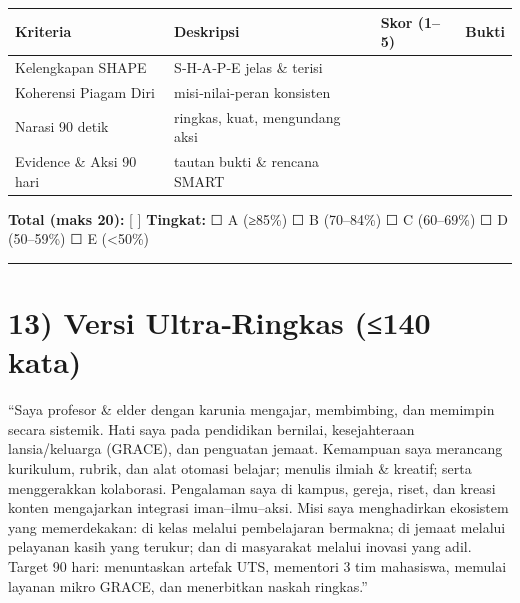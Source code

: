 \documentclass[
  letterpaper,
  DIV=11,
  numbers=noendperiod]{scrreprt}
\begin{document}
\begin{longtable}[]{@{}
  >{\raggedright\arraybackslash}p{}
  >{\raggedright\arraybackslash}p{}
  >{\raggedleft\arraybackslash}p{}
  >{\raggedright\arraybackslash}p{}@{}}
\toprule\noalign{}
\begin{minipage}[b]{\linewidth}\raggedright
Kriteria
\end{minipage} & \begin{minipage}[b]{\linewidth}\raggedright
Deskripsi
\end{minipage} & \begin{minipage}[b]{\linewidth}\raggedleft
Skor (1--5)
\end{minipage} & \begin{minipage}[b]{\linewidth}\raggedright
Bukti
\end{minipage} \\
\midrule\noalign{}
\endhead
\bottomrule\noalign{}
\endlastfoot
Kelengkapan SHAPE & S‑H‑A‑P‑E jelas \& terisi & & \\
Koherensi Piagam Diri & misi‑nilai‑peran konsisten & & \\
Narasi 90 detik & ringkas, kuat, mengundang aksi & & \\
Evidence \& Aksi 90 hari & tautan bukti \& rencana SMART & & \\
\end{longtable}

\textbf{Total (maks 20):} {[} {]} \textbf{Tingkat:} ☐ A (≥85\%) ☐ B
(70--84\%) ☐ C (60--69\%) ☐ D (50--59\%) ☐ E (\textless50\%)

\begin{center}\rule{0.5\linewidth}{0.5pt}\end{center}

\section{13) Versi Ultra‑Ringkas (≤140
kata)}\label{versi-ultraringkas-140-kata}

``Saya profesor \& elder dengan karunia mengajar, membimbing, dan
memimpin secara sistemik. Hati saya pada pendidikan bernilai,
kesejahteraan lansia/keluarga (GRACE), dan penguatan jemaat. Kemampuan
saya merancang kurikulum, rubrik, dan alat otomasi belajar; menulis
ilmiah \& kreatif; serta menggerakkan kolaborasi. Pengalaman saya di
kampus, gereja, riset, dan kreasi konten mengajarkan integrasi
iman--ilmu--aksi. Misi saya menghadirkan ekosistem yang memerdekakan: di
kelas melalui pembelajaran bermakna; di jemaat melalui pelayanan kasih
yang terukur; dan di masyarakat melalui inovasi yang adil. Target 90
hari: menuntaskan artefak UTS, mementori 3 tim mahasiswa, memulai
layanan mikro GRACE, dan menerbitkan naskah ringkas.''
\end{document}
